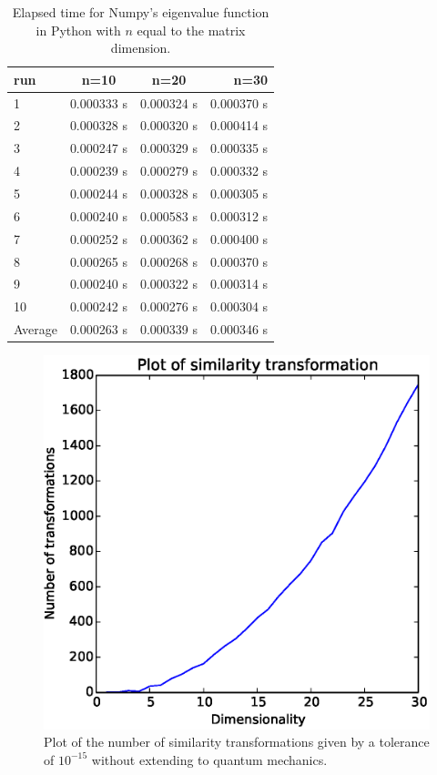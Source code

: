 \documentclass{article}
\begin{document}
\begin{table}[H]
    \centering
    \begin{tabular}{|l|c|c|r|}
    \hline
     run & n=10 & n=20 & n=30 \\
     \hline
      1  & 0.000333 s & 0.000324 s & 0.000370 s\\
      2  & 0.000328 s & 0.000320 s & 0.000414 s\\
      3  & 0.000247 s & 0.000329 s & 0.000335 s\\
      4  & 0.000239 s & 0.000279 s & 0.000332 s\\
      5  & 0.000244 s & 0.000328 s & 0.000305 s\\
      6  & 0.000240 s & 0.000583 s & 0.000312 s\\
      7  & 0.000252 s & 0.000362 s & 0.000400 s\\
      8  & 0.000265 s & 0.000268 s & 0.000370 s\\
      9  & 0.000240 s & 0.000322 s & 0.000314 s\\
      10 & 0.000242 s & 0.000276 s & 0.000304 s\\
      \hline
      Average & 0.000263 s & 0.000339 s & 0.000346 s\\
      \hline
    \end{tabular}
    \caption{Elapsed time for Numpy's eigenvalue function in Python with $n$ equal to the matrix dimension.}
    \label{timeusednumpy}
\end{table}



\begin{figure}
  \includegraphics{simtransformations.eps}
  \caption{Plot of the number of similarity transformations given by a tolerance of $10^{-15}$ without extending to quantum mechanics.}
  \label{simtrans}
\end{figure}
\end{document}

